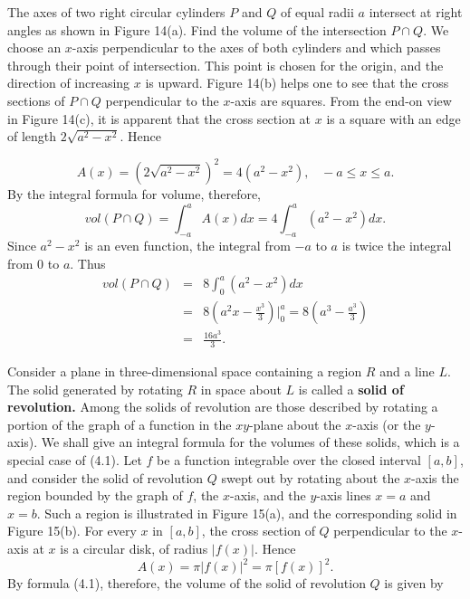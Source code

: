 \begin{example}
The axes of two right circular cylinders $P$ and $Q$ of equal radii $a$ intersect at right angles as shown in Figure 14(a). Find the volume of the intersection $P \cap Q$. We choose an $x$-axis perpendicular to the axes of both cylinders and which passes through their point of intersection. This point is chosen for the origin, and the direction of increasing $x$ is upward.
Figure 14(b) helps one to see that the cross sections of $P \cap Q$ perpendicular to the $x$-axis are squares. From the end-on view in Figure 14(c), it is apparent that the cross section at $x$ is a square with an edge of length $2\sqrt {a^2 - x^2}$. Hence


$$
A(x) = (2\sqrt{a^2 - x^2})^2 = 4(a^2 - x^2), \;\;\; -a \leq x \leq a.
$$
\noindent By the integral formula for volume, therefore,
$$
vol(P \cap Q) = \int_{-a}^a A(x) dx = 4\int_{-a}^a (a^2 - x^2) dx.
$$
\noindent Since $a^2 - x^2$ is an even function, the integral from $-a$ to $a$ is twice the integral from 0 to $a$. Thus 
\begin{eqnarray*}
vol(P \cap Q) &=& 8 \int_0^a (a^2 - x^2) dx\\
                     &=& 8 (a^2x - \frac{x^3}{3} )\big|_0^a = 8 (a^3 - \frac{a^3}{3}) \\
                     &=& \frac{16a^3}{3} .
\end{eqnarray*}
\end{example}

Consider a plane in three-dimensional space containing a region $R$ and a line $L$. The solid generated by rotating $R$ in space about $L$ is called a \textbf{solid of revolution.} Among the solids of revolution are those described by rotating a portion of the graph of a function in the $xy$-plane about the $x$-axis (or the $y$-axis). We shall give an integral formula for the volumes of these solids, which is a special case of (4.1). Let $f$ be a function integrable over the closed interval $[a, b]$, and consider the solid of revolution $Q$ swept out by rotating about the $x$-axis the region bounded by the graph of $f$, the $x$-axis, and the $y$-axis lines $x = a$ and $x = b$. Such a region is illustrated in Figure 15(a), and the corresponding solid in Figure 15(b). For every $x$ in $[a, b]$, the cross section of $Q$ perpendicular to the $x$-axis at $x$ is a circular disk, of radius $|f(x)|$. Hence
$$
A(x)= \pi | f(x) |^2= \pi [f(x)]^2.
$$
\noindent By formula (4.1), therefore, the volume of the solid of revolution $Q$ is given by

